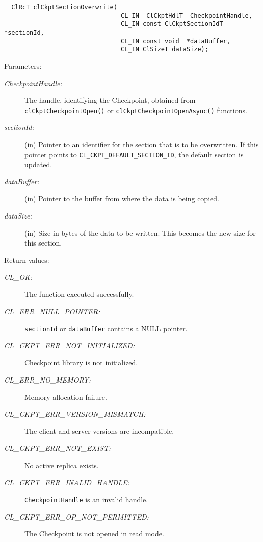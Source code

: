 \begin{flushleft}
\begin{Desc}
\footnotesize\begin{verbatim}  ClRcT clCkptSectionOverwrite(
                     			CL_IN  ClCkptHdlT  CheckpointHandle,
                     			CL_IN const ClCkptSectionIdT *sectionId,
                     			CL_IN const void  *dataBuffer,
                     			CL_IN ClSizeT dataSize);
\end{verbatim}
\normalsize
\end{Desc}
\begin{Desc}
\item[Parameters:]
\begin{description}
\item[{\em Checkpoint\-Handle:}]The handle, identifying the Checkpoint, obtained from {\tt{clCkptCheckpointOpen()}} or 
{\tt{clCkptCheckpointOpenAsync()}} functions. 
\item[{\em section\-Id:}](in) Pointer to an identifier for the section that is to be overwritten. If this pointer points to
{\tt{CL\_\-CKPT\_\-DEFAULT\_\-SECTION\_\-ID}}, the default section is updated. 
\item[{\em data\-Buffer:}](in) Pointer to the buffer from where the data is 
being copied. \item[{\em data\-Size:}](in) Size in bytes of the data to be written. This becomes the new size for this section.\end{description}
\end{Desc}
\begin{Desc}
\item[Return values:]
\begin{description}
\item[{\em CL\_\-OK:}]The function executed successfully. 
\item[{\em CL\_\-ERR\_\-NULL\_\-POINTER:}]{\tt{sectionId}} or {\tt{dataBuffer}} contains a NULL pointer. 
\item[{\em CL\_\-CKPT\_\-ERR\_\-NOT\_\-INITIALIZED:}]Checkpoint library is not initialized. 
\item[{\em CL\_\-ERR\_\-NO\_\-MEMORY:}]Memory allocation failure.
\item[{\em CL\_\-CKPT\_\-ERR\_\-VERSION\_\-MISMATCH:}]The client and server versions are incompatible.
\item[{\em CL\_\-CKPT\_\-ERR\_\-NOT\_\-EXIST:}] No active replica exists.
\item[{\em CL\_\-CKPT\_\-ERR\_\-INALID\_\-HANDLE:}]{\tt{CheckpointHandle}} is an invalid handle.
\item[{\em CL\_\-CKPT\_\-ERR\_\-OP\_\-NOT\_\-PERMITTED:}] The Checkpoint is not opened in read mode.

\end{description}
\end{Desc}
\end{flushleft}
